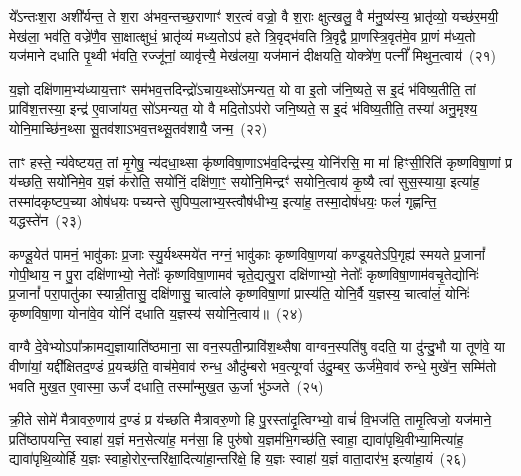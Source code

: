 ये᳚\-ऽन्तःश॒रा अशी᳚र्यन्त॒ ते श॒रा अ॑भव॒न्तच्छ॒राणाꣳ॑ शर॒त्वं वज्रो॒ वै श॒राः क्षुत्खलु॒ वै म॑नु॒ष्य॑स्य॒ भ्रातृ॑व्यो॒ यच्छ॑र॒मयी॒ मेख॑ला॒ भव॑ति॒ वज्रे॑णै॒व सा॒क्षात्क्षुधं॒ भ्रातृ॑व्यं मध्य॒तो\-ऽप॑ हते त्रि॒वृद्भ॑वति त्रि॒वृद्वै प्रा॒णस्त्रि॒वृत॑मे॒व प्रा॒णं म॑ध्य॒तो यज॑माने दधाति पृ॒थ्वी भ॑वति॒ रज्जू॑नां॒ व्यावृ॑त्त्यै॒ मेख॑लया॒ यज॑मानं दीक्षयति॒ योक्त्रे॑ण॒ पत्नीं᳚ मिथुन॒त्वाय॑~(२१)\ip

य॒ज्ञो दक्षि॑णाम॒भ्य॑ध्याय॒त्ताꣳ सम॑भव॒त्तदिन्द्रो॑\-ऽचाय॒थ्सो॑\-ऽमन्यत॒ यो वा इ॒तो ज॑नि॒ष्यते॒ स इ॒दं भ॑विष्य॒तीति॒ तां प्रावि॑श॒त्तस्या॒ इन्द्र॑ ए॒वाजा॑यत॒ सो॑\-ऽमन्यत॒ यो वै मदि॒तो\-ऽप॑रो जनि॒ष्यते॒ स इ॒दं भ॑विष्य॒तीति॒ तस्या॑ अनु॒मृश्य॒ योनि॒माच्छि॑न॒थ्सा सू॒तव॑शा\-ऽभव॒त्तथ्सू॒तव॑शायै॒ जन्म॒~(२२)\ip

ताꣳ हस्ते॒ न्य॑वेष्टयत॒ तां मृ॒गेषु॒ न्य॑दधा॒थ्सा कृ॑ष्णविषा॒णा\-ऽभ॑व॒दिन्द्र॑स्य॒ योनि॑रसि॒ मा मा॑ हिꣳसी॒रिति॑ कृष्णविषा॒णां प्र य॑च्छति॒ सयो॑निमे॒व य॒ज्ञं क॑रोति॒ सयो॑निं॒ दक्षि॑णा॒ꣳ॒ सयो॑नि॒मिन्द्रꣳ॑ सयोनि॒त्वाय॑ कृ॒ष्यै त्वा॑ सुस॒स्याया॒ इत्या॑ह॒ तस्मा॑दकृष्टप॒च्या ओष॑धयः पच्यन्ते सुपिप्प॒लाभ्य॒स्त्वौष॑धीभ्य॒ इत्या॑ह॒ तस्मा॒दोष॑धयः॒ फलं॑ गृह्णन्ति॒ यद्धस्ते॑न~(२३)\ip

कण्डू॒येत॑ पामनं॒ भावु॑काः प्र॒जाः स्यु॒र्यथ्स्मये॑त नग्नं॒ भावु॑काः कृष्णविषा॒णया॑ कण्डूयते\-ऽपि॒गृह्य॑ स्मयते प्र॒जानां᳚ गोपी॒थाय॒ न पु॒रा दक्षि॑णाभ्यो॒ नेतोः᳚ कृष्णविषा॒णामव॑ चृते॒द्यत्पु॒रा दक्षि॑णाभ्यो॒ नेतोः᳚ कृष्णविषा॒णाम॑वचृ॒तेद्योनिः॑ प्र॒जानां᳚ परा॒पातु॑का स्यान्नी॒तासु॒ दक्षि॑णासु॒ चात्वा॑ले कृष्णविषा॒णां प्रास्य॑ति॒ योनि॒र्वै य॒ज्ञस्य॒ चात्वा॑लं॒ योनिः॑ कृष्णविषा॒णा योना॑वे॒व योनिं॑ दधाति य॒ज्ञस्य॑ सयोनि॒त्वाय॑॥~(२४)\ip

{\anuvakamend[{रु॒न्ध॒ ए॒ष तस्मा᳚च्छर॒मयी॒ यूप॒स्तृती॑यं मिथुन॒त्वाय॒ जन्म॒ हस्ते॑ना॒ष्टाच॑त्वारिꣳशच्च}]}

वाग्वै दे॒वेभ्यो\-ऽपा᳚क्रामद्य॒ज्ञायाति॑ष्ठमाना॒ सा वन॒स्पती॒न्प्रावि॑श॒थ्सैषा वाग्वन॒स्पति॑षु वदति॒ या दु॑न्दु॒भौ या तूण॑वे॒ या वीणा॑यां॒ यद्दी᳚क्षितद॒ण्डं प्र॒यच्छ॑ति॒ वाच॑मे॒वाव॑ रुन्ध॒ औदु॑म्बरो भव॒त्यूर्ग्वा उ॑दु॒म्बर॒ ऊर्ज॑मे॒वाव॑ रुन्धे॒ मुखे॑न॒ सम्मि॑तो भवति मुख॒त ए॒वास्मा॒ ऊर्जं॑ दधाति॒ तस्मा᳚न्मुख॒त ऊ॒र्जा भु॑ञ्जते~(२५)\ip

क्री॒ते सोमे॑ मैत्रावरु॒णाय॑ द॒ण्डं प्र य॑च्छति मैत्रावरु॒णो हि पु॒रस्ता॑दृ॒त्विग्भ्यो॒ वाचं॑ वि॒भज॑ति॒ तामृ॒त्विजो॒ यज॑माने॒ प्रति॑\-ष्ठापयन्ति॒ स्वाहा॑ य॒ज्ञं मन॒सेत्या॑ह॒ मन॑सा॒ हि पुरु॑षो य॒ज्ञम॑भि॒गच्छ॑ति॒ स्वाहा॒ द्यावा॑\-पृथि॒वीभ्या॒मित्या॑ह॒ द्यावा॑पृथि॒व्योर्\mbox{}हि य॒ज्ञः स्वाहो॒रोर॒न्तरि॑क्षा॒दित्या॑हा॒न्तरि॑क्षे॒ हि य॒ज्ञः स्वाहा॑ य॒ज्ञं वाता॒दार॑भ॒ इत्या॑हा॒यं~(२६)\ip

